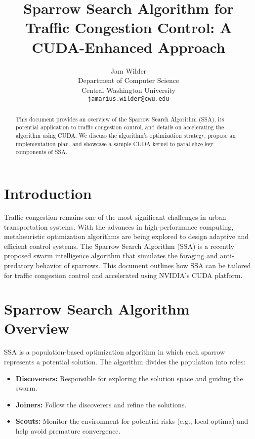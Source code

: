 \documentclass[11pt]{article}
\title{Sparrow Search Algorithm for Traffic Congestion Control: A CUDA-Enhanced Approach}
\author{Jam Wilder \\
Department of Computer Science \\
Central Washington University \\
\texttt{jamarius.wilder@cwu.edu}}
\begin{document}
\maketitle

\begin{abstract}
This document provides an overview of the Sparrow Search Algorithm (SSA), its potential application to traffic congestion control, and details on accelerating the algorithm using CUDA. We discuss the algorithm's optimization strategy, propose an implementation plan, and showcase a sample CUDA kernel to parallelize key components of SSA.
\end{abstract}

\section{Introduction}
Traffic congestion remains one of the most significant challenges in urban transportation systems. With the advances in high-performance computing, metaheuristic optimization algorithms are being explored to design adaptive and efficient control systems. The Sparrow Search Algorithm (SSA) is a recently proposed swarm intelligence algorithm that simulates the foraging and anti-predatory behavior of sparrows. This document outlines how SSA can be tailored for traffic congestion control and accelerated using NVIDIA's CUDA platform.

\section{Sparrow Search Algorithm Overview}
SSA is a population-based optimization algorithm in which each sparrow represents a potential solution. The algorithm divides the population into roles:
\begin{itemize}
    \item \textbf{Discoverers:} Responsible for exploring the solution space and guiding the swarm.
    \item \textbf{Joiners:} Follow the discoverers and refine the solutions.
    \item \textbf{Scouts:} Monitor the environment for potential risks (e.g., local optima) and help avoid premature convergence.
\end{itemize}
\end{document}
